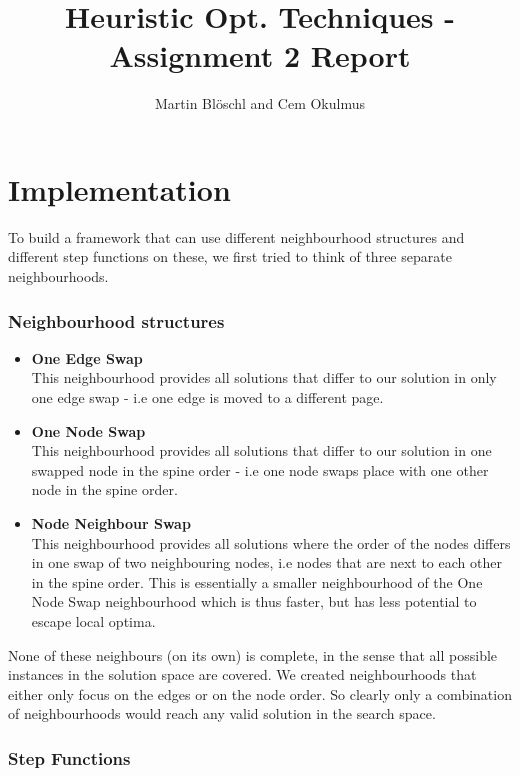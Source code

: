\documentclass [11pt]{article}
\begin{document}
\title{ Heuristic Opt. Techniques - Assignment 2 Report}
\author{ Martin Blöschl and Cem Okulmus }

\maketitle
\thispagestyle{empty}


\section{Implementation}
To build a framework that can use different neighbourhood structures and different step functions on these, we first tried to think of three separate neighbourhoods. 

\subsubsection{Neighbourhood structures}

\begin{itemize}
  \item \textbf{One Edge Swap} \\
  This neighbourhood provides all solutions that differ to our solution in only one edge swap - i.e one edge is moved to a different page.
  \item \textbf{One Node Swap} \\ 
  This neighbourhood provides all solutions that differ to our solution in one swapped node in the spine order - i.e one node swaps place with one other node in the spine order.
  \item \textbf{Node Neighbour Swap} \\
  This neighbourhood provides all solutions where the order of the nodes differs in one swap of two neighbouring nodes, i.e nodes that are next to each other in the spine order.  
  This is essentially a smaller neighbourhood of the One Node Swap neighbourhood which is thus faster, but has less potential to escape local optima.
\end{itemize}

None of these neighbours (on its own) is complete, in the sense that all possible instances in the solution space are covered.  We created neighbourhoods that either only focus on the edges or on the node order. So clearly only a combination of neighbourhoods would reach any valid solution in the search space.


\subsubsection{Step Functions}
\end{document}
